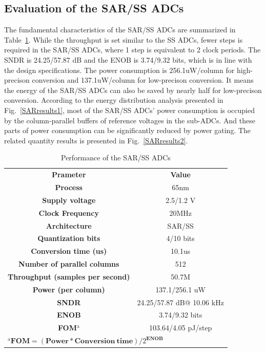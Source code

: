 \subsection{Evaluation of the SAR/SS ADCs}

The fundamental characteristics of the SAR/SS ADCs are summarized in Table~\ref{tab2}. 
While the throughput is set similar to the SS ADCs, fewer steps is required in the SAR/SS ADCs, where 1 step is equivalent to 2 clock periods. 
The SNDR is 24.25/57.87 dB and the ENOB is 3.74/9.32 bits, which is in line with the design specifications. 
The power consumption is 256.1uW/column for high-precison conversion and 137.1uW/column for low-precison conversion. It means the energy of the SAR/SS ADCs can also be saved by nearly half for low-precison conversion.
According to the energy distribution analysis presented in Fig.~\ref{SARresults1}, most of the SAR/SS ADCs' power consumption is occupied by the column-parallel buffers of reference voltages in the sub-ADCs. And these parts of power consumption can be significantly reduced by power gating.
The related quantity results is presented in Fig.~\ref{SARresults2}.

\begin{table}[htbp]
	\caption{Performance of the SAR/SS ADCs}
	\begin{center}
		\begin{tabular}{|c|c|}
			\hline
			\textbf{Prameter}& \textbf{Value} \\
			\hhline{|==|}
			\textbf{Process}& 65nm \\
			\hline 
			\textbf{Supply voltage}& 2.5/1.2 V \\
			\hline
			\textbf{Clock Frequency}&	20MHz \\
			\hline
			\textbf{Architecture}&	SAR/SS \\
			\hline
			\textbf{Quantization bits}&	4/10 bits \\
			\hline
			\textbf{Conversion time (us)}&	10.1us \\
			\hline
			\textbf{Number of parallel columns}&	512 \\
			\hline
			\textbf{Throughput (samples per second)}&	50.7M \\ 
			\hline
			\textbf{Power (per column)}&	137.1/256.1 uW \\
			\hline
			\textbf{SNDR}& 24.25/57.87 dB@ 10.06 kHz \\
			\hline
			\textbf{ENOB}& 3.74/9.32 bits \\
			\hline
			\textbf{FOM$^{\mathrm{a}}$}& 103.64/4.05 pJ/step\\
			\hline
			\multicolumn{2}{l}{$^{\mathrm{a}}\textbf{FOM}=(\textbf{Power}\ast \textbf{Conversion}\ \textbf{time})/2^{\textbf{ENOB}}$ }	    
		\end{tabular}
		\label{tab2}
	\end{center}
\end{table}

